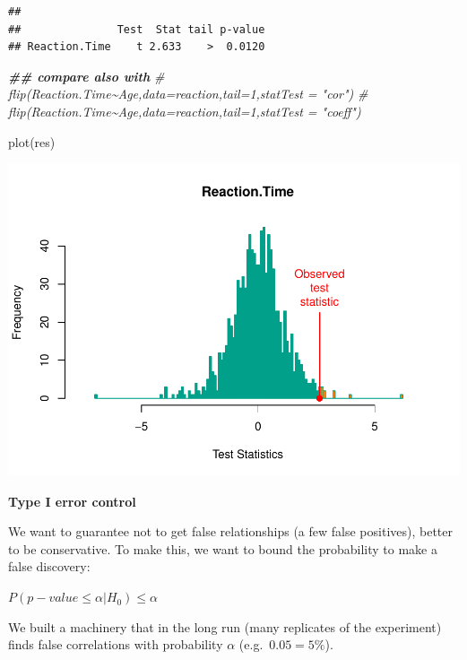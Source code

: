 \documentclass[
]{article}
\newenvironment{Shaded}{\begin{snugshade}}{\end{snugshade}}
\newcommand{\CommentTok}[1]{\textcolor[rgb]{0.56,0.35,0.01}{\textit{#1}}}
\newcommand{\DocumentationTok}[1]{\textcolor[rgb]{0.56,0.35,0.01}{\textbf{\textit{#1}}}}
\newcommand{\FunctionTok}[1]{\textcolor[rgb]{0.00,0.00,0.00}{#1}}
\newcommand{\NormalTok}[1]{#1}
\begin{document}
\begin{verbatim}
## 
##               Test  Stat tail p-value
## Reaction.Time    t 2.633    >  0.0120
\end{verbatim}

\begin{Shaded}
\begin{Highlighting}[]
\DocumentationTok{\#\# compare also with}
\CommentTok{\# flip(Reaction.Time\textasciitilde{}Age,data=reaction,tail=1,statTest = "cor")}
\CommentTok{\# flip(Reaction.Time\textasciitilde{}Age,data=reaction,tail=1,statTest = "coeff")}
\end{Highlighting}
\end{Shaded}

\begin{Shaded}
\begin{Highlighting}[]
\FunctionTok{plot}\NormalTok{(res)}
\end{Highlighting}
\end{Shaded}

\begin{center}\includegraphics{perm_files/figure-latex/unnamed-chunk-14-1} \end{center}

\textbf{Type I error control}

We want to guarantee not to get false relationships (a few false
positives), better to be conservative. To make this, we want to bound
the probability to make a false discovery:

\(P (p-value \leq \alpha | H_0) \leq \alpha\)

We built a machinery that in the long run (many replicates of the
experiment) finds false correlations with probability \(\alpha\)
(e.g.~\(0.05=5\%\)).
\end{document}
